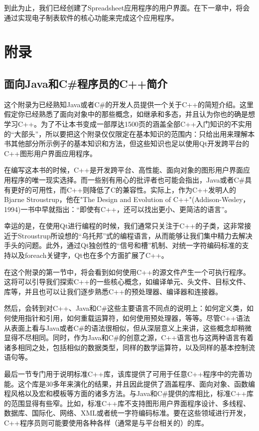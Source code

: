 \documentclass[11pt,oneside]{book}
\begin{document}
\begin{common-format}
到此为止，我们已经创建了Spreadsheet应用程序的用户界面。在下一章中，将会通过实现电子制表软件的核心功能来完成这个应用程序。




\appendix

\part{附录}
\chapter{面向Java和C\#{}程序员的C++简介}
这个附录为已经熟知Java或者C\#{}的开发人员提供一个关于C++的简短介绍。这里假定你已经熟悉了面向对象中的那些概念，如继承和多态，并且认为你也的确是想学习C++。为了不让本书变成一部厚达1500页的涵盖全部C++入门知识的不实用的“大部头”，所以要把这个附录仅仅限定在基本知识的范围内：只给出用来理解本书其他部分所示例子的基本知识和方法，但这些知识也足以使用Qt开发跨平台的C++图形用户界面应用程序。

在编写这本书的时候，C++是开发跨平台、高性能、面向对象的图形用户界面应用程序的唯一现实选择。而一些别有用心的批评者也可能会指出，Java或者C\#{}具有更好的可用性，而C++则降低了C的兼容性。实际上，作为C++发明人的Bjarne Stroustrup，他在"The Design and Evolution of C++"(Addison-Wesley，1994)一书中早就指出：“即使有C++，还可以找出更小、更简洁的语言”。

幸运的是，在使用Qt进行编程的时候，我们通常只关注于C++的子类，这非常接近于Stroustrup所设想的“乌托邦”式的编程语言，从而能够让我们集中精力去解决手头的问题。此外，通过Qt独创性的“信号和槽”机制、对统一字符编码标准的支持以及foreach关键字，Qt也在多个方面扩展了C++。

在这个附录的第一节中，将会看到如何使用C++的源文件产生一个可执行程序。这将可以引导我们探索C++的一些核心概念，如编译单元、头文件、目标文件、库等，并且也可以让我们逐步熟悉C++的预处理器、编译器和连接器。

然后，会转到对C++、Java和C\#{}这些主要语言不同点的说明上：如何定义类，如何使用指针和引用，如何重载运算符，如何使用预处理器，等等。尽管C++语法从表面上看与Java或者C\#{}的语法很相似，但从深层意义上来讲，这些概念却稍微显得不尽相同。同时，作为Java和C\#{}的创意之源，C++语言也与这两种语言有着诸多相同之处，包括相似的数据类型，同样的数学运算符，以及同样的基本控制流语句等。

最后一节专门用于说明标准C++库，该库提供了可用于任意C++程序中的完善功能。这个库是30多年来演化的结果，并且因此提供了涵盖程序、面向对象、函数编程风格以及宏和模板等方面的诸多方法。与Java和C\#{}提供的库相比，标准C++库的范围显得有些窄。比如，标准C++库不支持图形用户界面程序设计、多线程、数据库、国际化、网络、XML或者统一字符编码标准。要在这些领域进行开发，C++程序员则可能要使用各种各样（通常是与平台相关的）的库。


\end{common-format}
\end{document}
